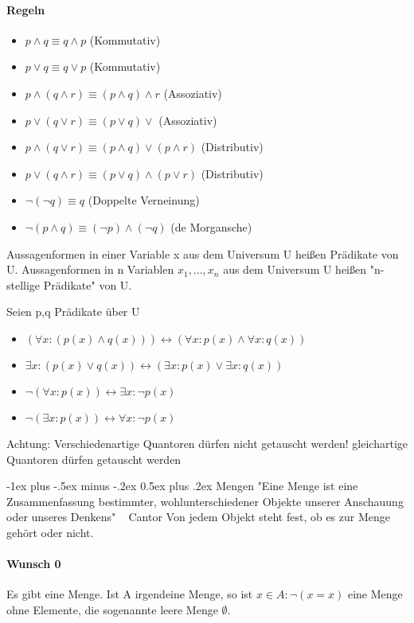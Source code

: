 \documentclass[10pt,landscape]{article}
\makeatletter
\renewcommand{\section}{\@startsection{section}{1}{0mm}%
                                {-1ex plus -.5ex minus -.2ex}%
                                {0.5ex plus .2ex}%
                                {\normalfont\large\bfseries}}
\makeatother
\begin{document}
\begin{multicols}{3}
\paragraph{Regeln}
\begin{itemize}
    \item $p\wedge q \equiv q \wedge p$ (Kommutativ)
    \item $p\vee q \equiv q \vee p$ (Kommutativ)
    \item $p\wedge (q \wedge r) \equiv (p \wedge q) \wedge r$ (Assoziativ)
    \item $p\vee ( q \vee r) \equiv (p \vee q) \vee$ (Assoziativ)
    \item $p\wedge (q\vee r) \equiv (p\wedge q) \vee (p\wedge r)$ (Distributiv)
    \item $p\vee (q\wedge r) \equiv (p\vee q) \wedge (p\vee r)$ (Distributiv)
    \item $\neg(\neg q) \equiv q$ (Doppelte Verneinung)
    \item $\neg(p\wedge q) \equiv (\neg p) \wedge (\neg q)$ (de Morgansche)
\end{itemize}

Aussagenformen in einer Variable x aus dem Universum U heißen Prädikate von U. Aussagenformen in n Variablen $x_1,...,x_n$ aus dem Universum U heißen "n-stellige Prädikate" von U.

Seien p,q Prädikate über U
\begin{itemize}
    \item $(\forall x: (p(x) \wedge q(x)))\leftrightarrow (\forall x: p(x) \wedge \forall x: q(x))$
    \item $\exists x: (p(x) \vee q(x)) \leftrightarrow (\exists x: p(x) \vee \exists x: q(x))$
    \item $\neg (\forall x:p(x))\leftrightarrow \exists x: \neg p(x)$
    \item $\neg(\exists x:p(x))\leftrightarrow \forall x:\neg p(x)$
\end{itemize}
Achtung: Verschiedenartige Quantoren dürfen nicht getauscht werden! gleichartige Quantoren dürfen getauscht werden

\section{Mengen}
"Eine Menge ist eine Zusammenfassung bestimmter, wohlunterschiedener Objekte unserer Anschauung oder unseres Denkens" ~ Cantor
Von jedem Objekt steht fest, ob es zur Menge gehört oder nicht.

\paragraph{Wunsch 0}
Es gibt eine Menge. Ist A irgendeine Menge, so ist ${x \in A: \neg (x=x)}$ eine Menge ohne Elemente, die sogenannte leere Menge $\emptyset$.


\end{multicols}
\end{document}
